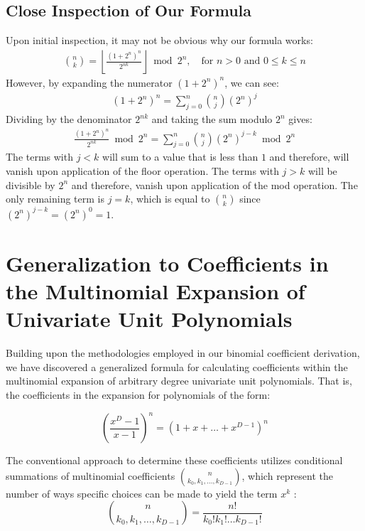 \documentclass{article}
\theoremstyle{plain}
\theoremstyle{definition}
\begin{document}
\subsection{Close Inspection of Our Formula}
Upon initial inspection, it may not be obvious why our formula works:
\begin{align*}
\binom{n}{k} = \left\lfloor\frac{(1 + 2^{n})^{n}}{2^{n k}}\right\rfloor \bmod{2^{n}}, \quad \text{for } n > 0 \text{ and } 0 \leq k \leq n
\end{align*}
However, by expanding the numerator $(1 + 2^{n})^{n}$, we can see:
\begin{align}
(1 + 2^{n})^{n} = \sum_{j=0}^{n} \binom{n}{j} (2^n)^{j}
\end{align}
Dividing by the denominator $2^{n k}$ and taking the sum modulo $2^n$ gives:
\begin{align}
\frac{(1 + 2^{n})^{n}}{2^{n k}} \bmod{2^n} = \sum_{j=0}^{n} \binom{n}{j} (2^n)^{j-k} \bmod{2^n}
\end{align}
The terms with $j < k$ will sum to a value that is less than $1$ and therefore, will vanish upon application of the floor operation. The terms with $j > k$ will be divisible by $2^n$ and therefore, vanish upon application of the mod operation. The only remaining term is $j = k$, which is equal to $\binom{n}{k}$ since $(2^n)^{j-k} = (2^n)^0 = 1$.

\section{Generalization to Coefficients in the Multinomial Expansion of Univariate Unit Polynomials}
Building upon the methodologies employed in our binomial coefficient derivation, we have discovered a generalized formula for calculating coefficients within the multinomial expansion of arbitrary degree univariate unit polynomials. That is, the coefficients in the expansion for polynomials of the form:

\begin{equation}
\left(\frac{x^{D}-1}{x-1}\right)^n = (1 + x + \ldots + x^{D-1})^n 
\end{equation}

The conventional approach to determine these coefficients utilizes conditional summations of multinomial coefficients \(\binom{n}{k_0, k_1, \ldots, k_{D-1}}\), which represent the number of ways specific choices can be made to yield the term \(x^k\) \cite{graham1994concrete}:
\begin{equation}
\binom{n}{k_0, k_1, \ldots, k_{D-1}} = \frac{n!}{k_0! k_1! \ldots k_{D-1}!}
\end{equation}
\end{document}
